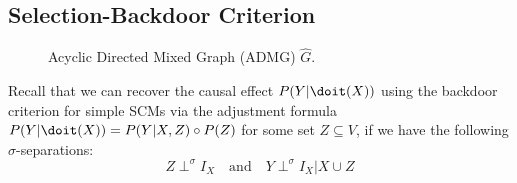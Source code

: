 \subsection{Selection-Backdoor Criterion}

\begin{figure}[ht]
    \centering
    \caption{Acyclic Directed Mixed Graph (ADMG) $\hat{G}$.}
    \label{fig:cadmg-3}
\end{figure}

Recall that we can recover the causal effect $P(Y|\doit(X))$ using the backdoor criterion for simple SCMs via the adjustment formula $P(Y|\doit(X)) = P(Y|X, Z)\circ P(Z)$ for some set $Z\subseteq V$, if we have the following $\sigma$-separations:
\begin{equation*}
    Z\perp^\sigma I_X \quad \text{and} \quad Y\perp^\sigma I_X|X\cup Z
\end{equation*}

